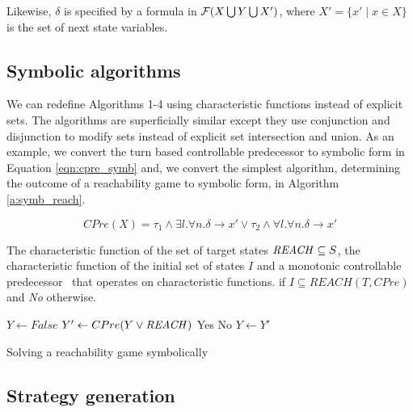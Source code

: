Likewise, $\delta$ is specified by a formula in $\mathcal{F}(X \bigcup Y \bigcup X')$, where $X' = \{x' \mid x \in X \}$ is the set of next state variables.

\subsection{Symbolic algorithms}

We can redefine Algorithms 1-4 using characteristic functions instead of explicit sets. The algorithms are superficially similar except they use conjunction and disjunction to modify sets instead of explicit set intersection and union. As an example, we convert the turn based controllable predecessor to symbolic form in Equation \ref{eqn:cpre_symb} and, we convert the simplest algorithm, determining the outcome of a reachability game to symbolic form, in Algorithm \ref{a:symb_reach}.

\begin{equation}
CPre(X) = \tau_1 \wedge \exists l. \forall n. \delta \rightarrow x' \vee \tau_2 \wedge \forall l. \forall n. \delta \rightarrow x' 
\label{eqn:cpre_symb}
\end{equation}

\begin{algorithm}
\begin{algorithmic}

\Require The characteristic function of the set of target states $\mathit{REACH} \subseteq S$, the characteristic function of the initial set of states $I$ and a monotonic controllable predecessor \cpre\ that operates on characteristic functions.
 if $I \subseteq REACH(T, CPre)$ and {\it No} otherwise.

    \State $Y \gets False$
    \Loop
        \State $Y' \gets CPre(Y \vee \mathit{REACH})$
                \State\Return Yes
            \Else
                \State\Return No
            \EndIf
        \EndIf
        \State $Y \gets Y'$
    \EndLoop
\EndFunction

\end{algorithmic}
\caption{Solving a reachability game symbolically}
\label{a:symb_reach}
\end{algorithm}

\subsection{Strategy generation}

